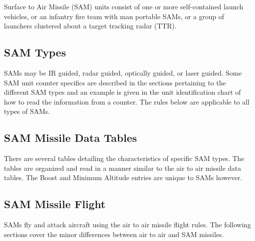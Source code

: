


\label{rule:sams}

Surface to Air Missile (SAM) units consist of one or more self-contained launch vehicles, or an infantry fire team with man portable SAMs, or a group of launchers clustered about a target tracking radar (TTR).

\subsection{SAM Types} SAMs may be IR guided, radar guided, optically guided, or laser guided. Some SAM unit counter specifics are described in the sections pertaining to the different SAM types and an example is given in the unit identification chart of how to read the information from a counter. The rules below are applicable to all types of SAMs.

\subsection{SAM Missile Data Tables} There are several tables detailing the characteristics of specific SAM types. The tables are organized and read in a manner similar to the air to air missile data tables. The Boost and Minimum Altitude entries are unique to SAMs however.

\subsection{SAM Missile Flight} SAMs fly and attack aircraft using the air to air missile flight rules. The following sections cover the minor differences between air to air and SAM missiles.


